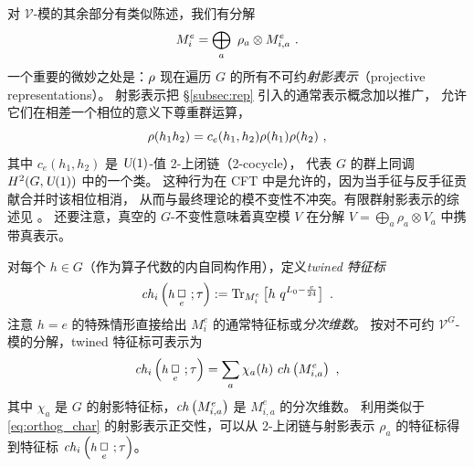 对 $\mathcal{V}$-模的其余部分有类似陈述，我们有分解
\begin{equation}
M_i^e=\bigoplus_a~\rho_a\otimes M_{i,a}^e~.
\end{equation}
一个重要的微妙之处是：$\rho$ 现在遍历 $G$ 的所有不可约\emph{射影表示}（projective representations）。
射影表示把 \S\ref{subsec:rep} 引入的通常表示概念加以推广，
允许它们在相差一个相位的意义下尊重群运算，
\begin{equation}
\label{cocycles}
\rho(h_1h_2)=c_e(h_1,h_2)\rho(h_1)\rho(h_2)~,
\end{equation}
其中 $c_e(h_1,h_2)$ 是 $\operatorname{\textsl{U}}(1)$-值 2-上闭链（2-cocycle），
代表 $G$ 的群上同调 $H^2(G,\operatorname{\textsl{U}}(1))$ 中的一个类。
这种行为在 CFT 中是允许的，因为当手征与反手征贡献合并时该相位相消，
从而与最终理论的模不变性不冲突。有限群射影表示的综述见 \cite{Tania-LuminiţaCostache2009Oipr}。
还要注意，真空的 $G$-不变性意味着真空模 $V$ 在分解
$V=\bigoplus_a \rho_a\otimes V_a$ 中携带真表示。


对每个 $h\in G$（作为算子代数的内自同构作用），定义\emph{twined 特征标}
\begin{equation}
\label{eq:twined_char}
{\it ch}_i\left(\mbox{\fontsize{9}{10}\selectfont $h\,$}\underset{e}{\Box}~;\t\right) :=\tr_{M^e_i}\left[h~q^{L_0-\frac{c}{24}}\right]~.
\end{equation}
注意 $h=e$ 的特殊情形直接给出 $M_i^e$ 的通常特征标或\emph{分次维数}。
按对不可约 $\mathcal{V}^G$-模的分解，twined 特征标可表示为
\begin{equation}
\label{eq:twined_chars}
{\it ch}_i\left(\mbox{\fontsize{9}{10}\selectfont $h\,$}\underset{e}{\Box}~;\t\right)=\sum_a\chi_{a}(h)~ ch\left(M_{i,a}^e\right)~,
\end{equation}
其中 $\chi_a$ 是 $G$ 的射影特征标，${\it ch}\left(M_{i,a}^e\right)$ 是 $M_{i,a}^e$ 的分次维数。
利用类似于 \eqref{eq:orthog_char} 的射影表示正交性，可以从 2-上闭链与射影表示 $\rho_a$
的特征标得到特征标 ${\it ch}_i\left(\mbox{\fontsize{9}{10}\selectfont $h\,$}\underset{e}{\Box}~;\t\right)$。


